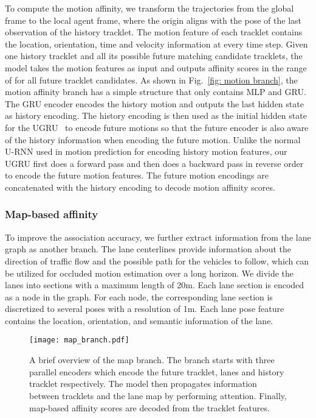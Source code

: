 \documentclass{article} \usepackage{iclr2023_conference,times}
\begin{document}
To compute the motion affinity, we transform the trajectories from the global frame to the local agent frame, where the origin aligns with the pose of the last observation of the history tracklet. The motion feature of each tracklet contains the location, orientation, time and velocity information at every time step. Given one history tracklet and all its possible future matching candidate tracklets, the model takes the motion features as input and outputs affinity scores in the range of  for all future tracklet candidates. As shown in Fig.~\ref{fig: motion branch}, the motion affinity branch has a simple structure that only contains MLP and GRU. The GRU encoder encodes the history motion and outputs the last hidden state as history encoding. The history encoding is then used as the initial hidden state for the UGRU~\cite{urnn} to encode future motions so that the future encoder is also aware of the history information when encoding the future motion. Unlike the normal U-RNN used in motion prediction for encoding history motion features, our UGRU first does a forward pass and then does a backward pass in reverse order to encode the future motion features. The future motion encodings are concatenated with the history encoding to decode motion affinity scores. 
\vspace{-1mm}
\subsubsection{Map-based affinity}
\vspace{-1mm}
\label{sec: map affinity}
To improve the association accuracy, we further extract information from the lane graph as another branch. The lane centerlines provide information about the direction of traffic flow and the possible path for the vehicles to follow, which can be utilized for occluded motion estimation over a long horizon. We divide the lanes into sections with a maximum length of 20m. Each lane section is encoded as a node in the graph. For each node, the corresponding lane section is discretized to several poses with a resolution of 1m. Each lane pose feature contains the location, orientation, and semantic information of the lane. 

\begin{figure*}[ht]
\centering
\texttt{[image: map\_branch.pdf]}
\caption{A brief overview of the map branch. The branch starts with three parallel encoders which encode the future tracklet, lanes and history tracklet respectively. The model then propagates information between tracklets and the lane map by performing attention. Finally, map-based affinity scores are decoded from the tracklet features.}
\label{fig: map branch}
\end{figure*}
\end{document}
